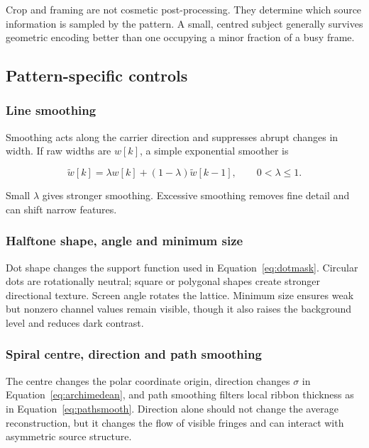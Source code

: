 Crop and framing are not cosmetic post-processing. They determine which source information is sampled by the pattern. A small, centred subject generally survives geometric encoding better than one occupying a minor fraction of a busy frame.

\subsection{Pattern-specific controls}

\subsubsection{Line smoothing}

Smoothing acts along the carrier direction and suppresses abrupt changes in width. If raw widths are $w[k]$, a simple exponential smoother is

\begin{equation}
\widetilde{w}[k]=\lambda w[k]+(1-\lambda)\widetilde{w}[k-1],
\qquad 0<\lambda\le1.
\label{eq:expsmooth}
\end{equation}

Small $\lambda$ gives stronger smoothing. Excessive smoothing removes fine detail and can shift narrow features.

\subsubsection{Halftone shape, angle and minimum size}

Dot shape changes the support function used in Equation~\eqref{eq:dotmask}. Circular dots are rotationally neutral; square or polygonal shapes create stronger directional texture. Screen angle rotates the lattice. Minimum size ensures weak but nonzero channel values remain visible, though it also raises the background level and reduces dark contrast.

\subsubsection{Spiral centre, direction and path smoothing}

The centre changes the polar coordinate origin, direction changes $\sigma$ in Equation~\eqref{eq:archimedean}, and path smoothing filters local ribbon thickness as in Equation~\eqref{eq:pathsmooth}. Direction alone should not change the average reconstruction, but it changes the flow of visible fringes and can interact with asymmetric source structure.



